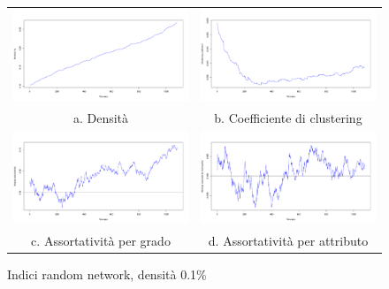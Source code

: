 \documentclass[a4paper,12pt]{article}
\begin{document}
\begin{figure}[t]
\begin{tabular}{cc}
  \includegraphics[width=83mm]{images/evolution_1000_rnd_1080_01_0.pdf} &   \includegraphics[width=83mm]{images/clustering_1000_rnd_1080_01_0.pdf} \\
a. Densità & b. Coefficiente di clustering \\[6pt]
 \includegraphics[width=83mm]{images/deg_assortativity_1000_rnd_1080_01_0.pdf} &   \includegraphics[width=83mm]{images/homophily_1000_rnd_1080_01_0.pdf} \\
c. Assortatività per grado & d. Assortatività per attributo \\[6pt]
\end{tabular}
\centering
\caption{Indici random network, densità 0.1\%}
\label{fig:rnd01}
\end{figure}
\end{document}
